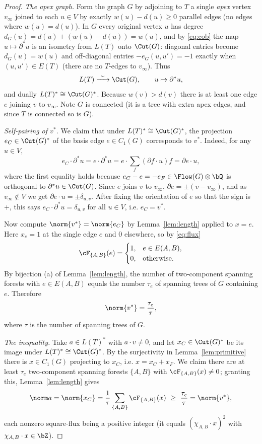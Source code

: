 \begin{proof}
\emph{The apex graph.}  Form the graph $G$ by adjoining to $T$ a single \emph{apex} vertex
$v_\infty$ joined to each $u\in V$ by exactly $w(u)-d(u)\ge0$ parallel edges (no edges where
$w(u)=d(u)$).  In $G$ every original vertex $u$ has degree
$d_G(u)=d(u)+(w(u)-d(u))=w(u)$, and by \eqref{eq:cob} the map $u\mapsto\partial^\ast u$ is an
isometry from $L(T)$ onto $\Cut(G)$: diagonal entries become $d_G(u)=w(u)$ and off-diagonal
entries $-e_G(u,u')=-1$ exactly when $(u,u')\in E(T)$ (there are no $T$-edges to $v_\infty$).
Thus
\[
L(T)\xrightarrow{\ \sim\ }\Cut(G),\qquad u\mapsto\partial^\ast u,
\]
and dually $L(T)^\ast\cong\Cut(G)^\ast$.  Because $w(v)>d(v)$ there is at least one edge $e$
joining $v$ to $v_\infty$.  Note $G$ is connected (it is a tree with extra apex edges, and
since $T$ is connected so is $G$).

\emph{Self-pairing of $v^\ast$.}  We claim that under
$L(T)^\ast\cong\Cut(G)^\ast$, the projection $e_C\in\Cut(G)^\ast$ of the basis edge
$e\in C_1(G)$ corresponds to $v^\ast$.  Indeed, for any $u\in V$,
\[
e_C\cdot\partial^\ast u=e\cdot\partial^\ast u
=e\cdot\sum_{f}(\partial f\cdot u)f=\partial e\cdot u,
\]
where the first equality holds because $e_C-e=-e_F\in\Flow(G)\otimes\bQ$ is orthogonal to
$\partial^\ast u\in\Cut(G)$.  Since $e$ joins $v$ to $v_\infty$, $\partial e=\pm(v-v_\infty)$,
and as $v_\infty\notin V$ we get $\partial e\cdot u=\pm\delta_{u,v}$.  After fixing the
orientation of $e$ so that the sign is $+$, this says $e_C\cdot\partial^\ast u=\delta_{u,v}$
for all $u\in V$, i.e. $e_C=v^\ast$.

Now compute $\norm{v^\ast}=\norm{e_C}$ by Lemma~\ref{lem:length} applied to $x=e$.  Here
$x_e=1$ at the single edge $e$ and $0$ elsewhere, so by \eqref{eq:flux}
\[
\cF_{\{A,B\}}(e)=
\begin{cases}1,& e\in E(A,B),\\0,&\text{otherwise.}\end{cases}
\]
By bijection (a) of Lemma~\ref{lem:length}, the number of two-component spanning forests with
$e\in E(A,B)$ equals the number $\tau_e$ of spanning trees of $G$ containing $e$.  Therefore
\begin{equation}
\label{eq:vstar}
\norm{v^\ast}=\frac{\tau_e}{\tau},
\end{equation}
where $\tau$ is the number of spanning trees of $G$.

\emph{The inequality.}  Take $a\in L(T)^\ast$ with $a\cdot v\ne0$, and let
$x_C\in\Cut(G)^\ast$ be its image under $L(T)^\ast\cong\Cut(G)^\ast$.  By the surjectivity in
Lemma~\ref{lem:primitive} there is $x\in C_1(G)$ projecting to $x_C$, i.e.
$x=x_C+x_F$.  We claim there are at least $\tau_e$ two-component spanning forests $\{A,B\}$
with $\cF_{\{A,B\}}(x)\ne0$; granting this, Lemma~\ref{lem:length} gives
\[
\norm a=\norm{x_C}=\frac1\tau\sum_{\{A,B\}}\cF_{\{A,B\}}(x)
\ \ge\ \frac{\tau_e}{\tau}=\norm{v^\ast},
\]
each nonzero square-flux being a positive integer (it equals $(\chi_{A,B}\cdot x)^2$ with
$\chi_{A,B}\cdot x\in\bZ$).


\end{proof}
